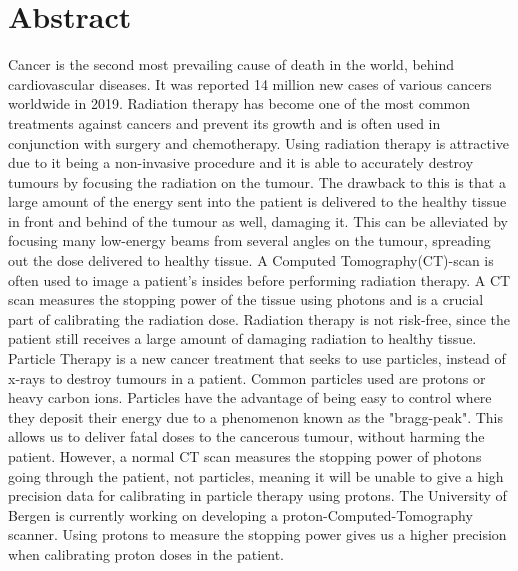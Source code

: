\documentclass[main.tex]{subfiles}
\begin{document}
\section{Abstract}
Cancer is the second most prevailing cause of death in the world, behind cardiovascular diseases. It was reported 14 million new cases of various cancers worldwide in 2019.
Radiation therapy has become one of the most common treatments against cancers and prevent its growth and is often used in conjunction with surgery and chemotherapy. Using radiation therapy is attractive due to it being a non-invasive procedure and it is able to accurately destroy tumours by focusing the radiation on the tumour. The drawback to this is that a large amount of the energy sent into the patient is delivered to the healthy tissue in front and behind of the tumour as well, damaging it. This can be alleviated by focusing many low-energy beams from several angles on the tumour, spreading out the dose delivered to healthy tissue. 
A Computed Tomography(CT)-scan is often used to image a patient's insides before performing radiation therapy. A CT scan measures the stopping power of the tissue using photons and is a crucial part of calibrating the radiation dose.
Radiation therapy is not risk-free, since the patient still receives a large amount of damaging radiation to healthy tissue. Particle Therapy is a new cancer treatment that seeks to use particles, instead of x-rays to destroy tumours in a patient. Common particles used are protons or heavy carbon ions. Particles have the advantage of being easy to control where they deposit their energy due to a phenomenon known as the "bragg-peak". This allows us to deliver fatal doses to the cancerous tumour, without harming the patient.
However, a normal CT scan measures the stopping power of photons going through the patient, not particles, meaning it will be unable to give a high precision data for calibrating in particle therapy using protons. 
The University of Bergen is currently working on developing a proton-Computed-Tomography scanner. Using protons to measure the stopping power gives us a higher precision when calibrating proton doses in the patient.
\end{document}
